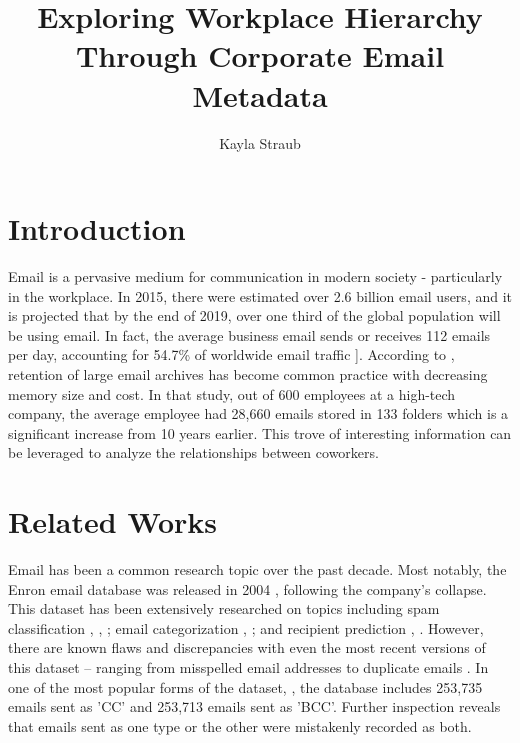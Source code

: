\documentclass[conference]{IEEEtran}
\begin{document}
\title{Exploring Workplace Hierarchy Through Corporate Email Metadata}
\author{Kayla Straub}
\maketitle

\begin{abstract}
\end{abstract}
\section{Introduction}
Email is a pervasive medium for communication in modern society - particularly in the workplace.  In 2015, there were estimated over 2.6 billion email users, and it is projected that by the end of 2019, over one third of the global population will be using email.  In fact, the average business email sends or receives 112 emails per day, accounting for 54.7\% of worldwide email traffic \cite{radicati_emails_2015}].  According to \cite{fisher_revisiting_2006}, retention of large email archives has become common practice with decreasing memory size and cost.  In that study, out of 600 employees at a high-tech company, the average employee had 28,660 emails stored in 133 folders which is a significant increase from 10 years earlier.  This trove of interesting information can be leveraged to analyze the relationships between coworkers.

\section{Related Works}
Email has been a common research topic over the past decade.  Most notably, the Enron email database was released in 2004 \cite{klimt_introducing_2004}, following the company's collapse.  This dataset has been extensively researched on topics including spam classification \cite{martin_analyzing_2005}, \cite{gaber_e-mail_2016}, \cite{shams_classifying_2013}; email categorization \cite{he_novel_2014}, \cite{keila_structure_2005}; and recipient prediction \cite{sofershtein_predicting_2015}, \cite{hu_towards_2012}.  However, there are known flaws and discrepancies with even the most recent versions of this dataset -- ranging from misspelled email addresses \cite{nordbo_data_2014} to duplicate emails \cite{waterman_big_2014}. In one of the most popular forms of the dataset, \cite{shetty_enron_2004}, the database includes 253,735 emails sent as 'CC' and  253,713 emails sent as 'BCC'.  Further inspection reveals that emails sent as one type or the other were mistakenly recorded as both. 
\end{document}
